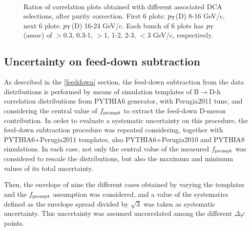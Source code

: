 \begin{figure}[h]
 \\
 \caption{Ratios of correlation plots obtained with different associated DCA selections, after purity correction. First 6 plots: $p_{\rm T}$(D) 8-16 GeV/c, next 6 plots: $p_{\rm T}$(D) 16-24 GeV/c. Each bunch of 6 plots has $p_{\rm T}$(assoc) of $>$0.3, 0.3-1, $>$1, 1-2, 2-3, $<$3 GeV/c, respectively.}
\label{fig:DCAvarData2}
\end{figure}

\subsection{Uncertainty on feed-down subtraction}
As described in the \ref{feeddown} section, the feed-down subtraction from the data distributions is performed by means of simulation templates of B$\rightarrow$D-h correlation distributions from PYTHIA6 generator, with Perugia2011 tune, and considering the central value of $f_{\rm prompt}$ to extract the feed-down D-meson contribution. In order to evaluate a systematic uncertainty on this procedure, the feed-down subtraction procedure was repeated considering, together with PYTHIA6+Perugia2011 templates, also PYTHIA6+Perugia2010 and PYTHIA8 simulations. In each case, not only the central value of the measured $f_{\rm prompt}$ was considered to rescale the distributions, but also the maximum and minimum values of its total uncertainty.

Then, the envelope of nine the different cases obtained by varying the templates and the $f_{\rm prompt}$ assumption was considered, and a value of the systematics defined as the envelope spread divided by $\sqrt{3}$ was taken as systematic uncertainty. This uncertainty was assumed uncorrelated among the different $\Delta\varphi$ points.

